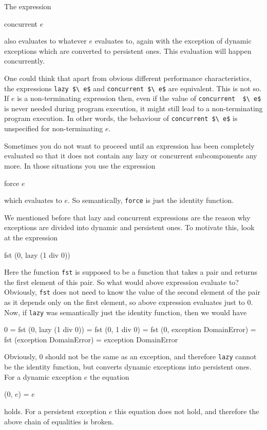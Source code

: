 \documentclass[11pt]{amsart}
\newcommand{\babelsrc}[1] {\lstinline!#1!}
\begin{document}
The expression
\begin{babellisting}
concurrent $e$
\end{babellisting}
also evaluates to whatever $e$ evaluates to, again with the exception of dynamic exceptions which are converted to persistent ones. This evaluation will happen concurrently.  

One could think that apart from obvious different performance characteristics, the expressions \babelsrc{lazy $\ e$} and \babelsrc{concurrent $\ e$} are equivalent. This is not so.
If $e$ is a non-terminating expression then, even if  the value of  \babelsrc{concurrent  $\ e$} is never needed during program execution, it might still lead to a non-terminating program execution. In other words, the behaviour of \babelsrc{concurrent $\ e$}  is unspecified for non-terminating $e$.

Sometimes you do not want to proceed until an expression has been completely evaluated so that it does not contain any lazy or concurrent subcomponents any more. In those situations you use the expression
\begin{babellisting}
force $e$
\end{babellisting}
which evaluates to $e$. So semantically, \babelsrc{force} is just the identity function. 

We mentioned before that lazy and concurrent expressions are the reason why exceptions are divided into dynamic and persistent ones. To motivate this, look at the expression
\begin{babellisting}
fst (0, lazy (1 div 0))
\end{babellisting}
Here the function \babelsrc{fst} is supposed to be a function that takes a pair and returns the first element of this pair. So what would above expression evaluate to? Obviously, \babelsrc{fst} does not need to know the value of the second element of the pair as it depends only on the first element, so above expression evaluates just to 0. Now, if \babelsrc{lazy} was semantically just the identity function, then we would have
\begin{babellisting}
0 = fst (0, lazy (1 div 0)) = fst (0, 1 div 0) = fst (0, exception DomainError) 
   = fst (exception DomainError) = exception DomainError
\end{babellisting}
Obviously, $0$ should not be the same as an exception, and therefore \babelsrc{lazy} cannot be the identity function, but converts dynamic exceptions into persistent ones. For a dynamic exception $e$ the equation
\begin{babellisting}
(0, $e$) = $e$
\end{babellisting}
holds. For a persistent exception $e$ this equation does not hold, and therefore the above chain of equalities is broken.
\end{document}
